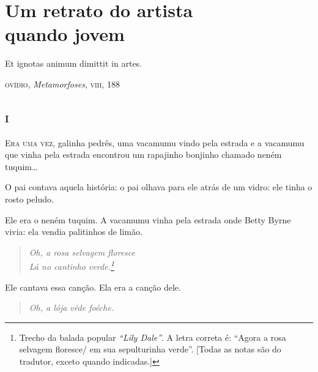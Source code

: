 ﻿

\part[Um retrato do artista quando jovem]{Um retrato do artista\\ quando jovem}


\clearpage

\vspace*{.5\textheight}
\thispagestyle{empty}

\epigraph{Et ignotas animum dimittit in artes.\footnotemark}{\textsc{ovídio}, \textit{Metamorfoses}, \textsc{viii}, 188}

\chapter{\textsc{i}}

\textsc{Era uma vez,} galinha pedrês, uma vacamumu vindo pela estrada e a
vacamumu que vinha pela estrada encontrou um rapajinho bonjinho chamado
neném tuquim\ldots{}

O pai contava aquela história: o pai olhava para ele atrás de um vidro: 	
ele tinha o rosto peludo.

Ele era o neném tuquim. A vacamumu vinha pela estrada onde Betty Byrne
vivia: ela vendia palitinhos de limão.

\begin{verse}\itshape
\textit{Oh, a rosa selvagem floresce}\\
\textit{Lá no cantinho verde}.\footnote{ Trecho da balada
popular \textit{“Lily Dale”}. A letra correta é: “Agora a rosa selvagem floresce/ em sua sepulturinha verde”. [Todas as notas são do tradutor, exceto quando indicadas.]}
\end{verse}

Ele cantava essa canção. Ela era a canção dele.

\begin{verse}\itshape
\textit{Oh, a lója vêde foéche.}
\end{verse}

